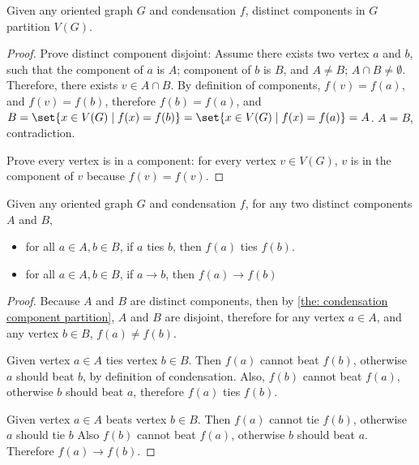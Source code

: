 \begin{theorem}\label{the: condensation component partition}
  Given any oriented graph \(G\) and condensation \(f\),
  distinct components in \(G\) partition \(V(G)\).
\end{theorem}

\begin{proof}
  Prove distinct component disjoint:
  Assume there exists two vertex \(a\) and \(b\),
  such that the component of \(a\) is \(A\);
  component of \(b\) is \(B\),
  and \(A \neq B\); \(A \cap B \neq \emptyset \).
  Therefore, there exists \(v \in A \cap B\).
  By definition of components,
  \(f(v) = f(a)\), and \(f(v) = f(b)\),
  therefore \(f(b) = f(a)\),
  and \(B
  = \set{x \in V(G) \mid f(x) = f(b)}
  = \set{x \in V(G) \mid f(x) = f(a)}
  = A\).
   \(A = B\), contradiction.

  Prove every vertex is in a component:
  for every vertex \(v \in V(G)\),
  \(v\) is in the component of \(v\) because \(f(v) = f(v)\).
\end{proof}

\begin{lemma}\label{the: vertex force image beating}
  Given any oriented graph \(G\) and condensation \(f\),
  for any two distinct components \(A\) and \(B\),
  \begin{itemize}
    \item
      for all \(a \in A, b \in B\), if \(a\) ties \(b\),
      then \(f(a)\) ties \(f(b)\).
    \item
      for all \(a \in A, b \in B\), if \(a \to b\),
      then \(f(a) \to f(b)\)
  \end{itemize}
\end{lemma}

\begin{proof}
  Because \(A\) and \(B\) are distinct components,
  then by \cref{the: condensation component partition},
  \(A\) and \(B\) are disjoint,
  therefore for any vertex \(a \in A\),
  and any vertex \(b \in B\), \(f(a) \neq f(b)\).

  Given vertex \(a \in A\) ties vertex \(b \in B\).
  Then \(f(a)\) cannot beat \(f(b)\),
  otherwise \(a\) should beat \(b\), by definition of condensation.
  Also, \(f(b)\) cannot beat \(f(a)\),
  otherwise \(b\) should beat \(a\),
  therefore \(f(a)\) ties \(f(b)\).

  Given vertex \(a \in A\) beats vertex \(b \in B\).
  Then \(f(a)\) cannot tie \(f(b)\),
  otherwise \(a\) should tie \(b\)
  Also \(f(b)\) cannot beat \(f(a)\),
  otherwise \(b\) should beat \(a\).
  Therefore \(f(a) \to f(b)\).
\end{proof}


